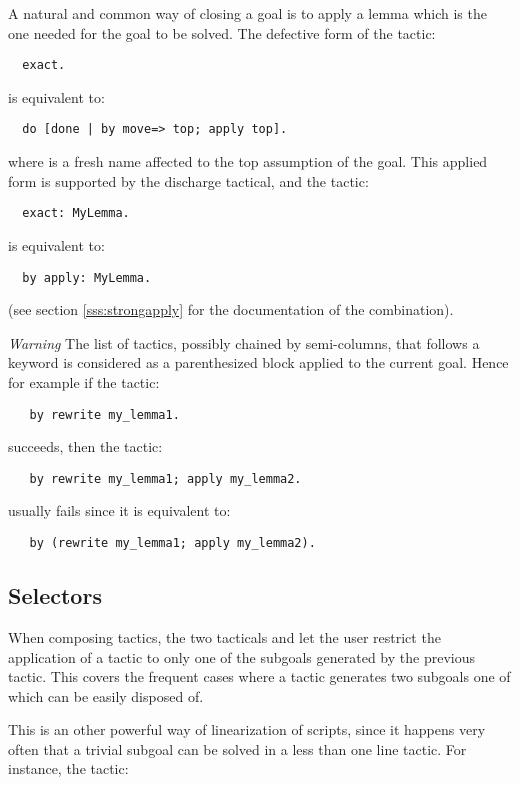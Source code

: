 A natural and common way of closing a goal is to apply a lemma which
is the  one needed for the goal to be solved. The defective
form of the tactic:
\begin{lstlisting}
  exact.
\end{lstlisting}
is equivalent to:
\begin{lstlisting}
  do [done | by move=> top; apply top].
\end{lstlisting}
where  is a fresh name affected to the top assumption of the goal.
This applied form is supported by the  \ssrC{:} discharge tactical, and
the tactic:
\begin{lstlisting}
  exact: MyLemma.
\end{lstlisting}
is equivalent to:
\begin{lstlisting}
  by apply: MyLemma.
\end{lstlisting}
(see section \ref{sss:strongapply} for the documentation of the 
combination).

\textit{Warning} The list of tactics, possibly chained by
semi-columns, that follows a  keyword is considered as a
parenthesized block
applied to the current goal. Hence for example if the tactic:
\begin{lstlisting}
   by rewrite my_lemma1.
\end{lstlisting}
succeeds, then the tactic:
\begin{lstlisting}
   by rewrite my_lemma1; apply my_lemma2.
\end{lstlisting}
usually fails since it is equivalent to:
\begin{lstlisting}
   by (rewrite my_lemma1; apply my_lemma2).
\end{lstlisting}

\subsection{Selectors}\label{ssec:select}

When composing tactics, the two tacticals  and
 let the user restrict the application of a tactic to only one
of the subgoals generated by the previous tactic. This
covers the frequent cases where a tactic generates two subgoals one of
which can be easily disposed of.

This is an other powerful way of linearization of scripts, since it
happens very often that a trivial subgoal can be solved in a less than
one line tactic. For instance, the tactic:

